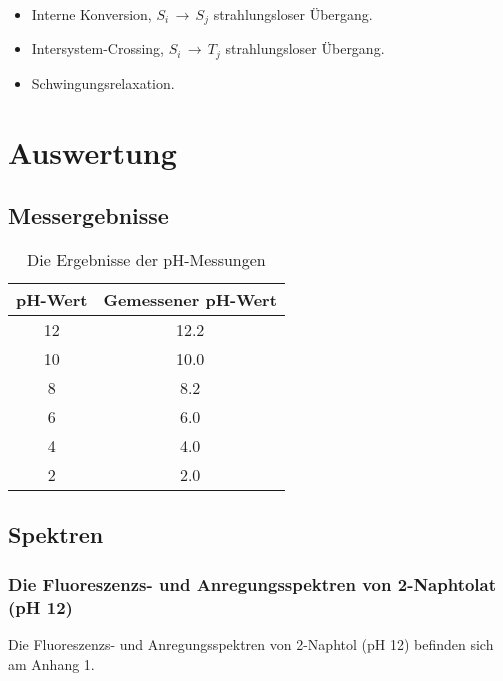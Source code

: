 \documentclass[12pt]{article}
\begin{document}
\begin{itemize}
  \item[]  Interne Konversion,
    $S_i\,\longrightarrow\,S_j$ strahlungsloser Übergang.

  \item[]  Intersystem-Crossing,
    $S_i\,\longrightarrow\,T_j$ strahlungsloser Übergang.

  \item[]  
    Schwingungsrelaxation.
\end{itemize}


\section{Auswertung}
\subsection{Messergebnisse}
\begin{table}[!ht]
\centering
  \begin{tabular}{cc}
    pH-Wert & Gemessener pH-Wert   \\
    \hline
    12 &  12.2    \\
    10 &  10.0 \\
    8  &   8.2  \\
    6  &   6.0 \\
    4  &   4.0  \\
    2  &   2.0  \\
  \end{tabular}
  \caption{ Die Ergebnisse der pH-Messungen}
\end{table}
\subsection{Spektren}
\subsubsection{Die Fluoreszenzs- und Anregungsspektren von 2-Naphtolat (pH 12)}
Die Fluoreszenzs- und Anregungsspektren von 2-Naphtol (pH 12) befinden sich am Anhang 1.
\end{document}
